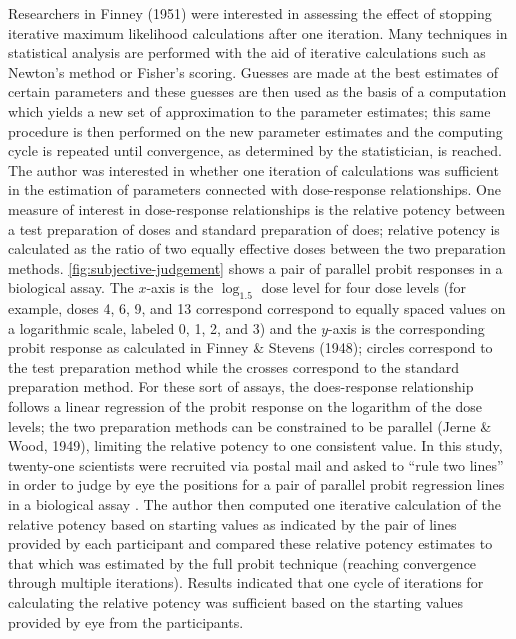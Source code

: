 \documentclass[print]{nuthesis}
\begin{document}
Researchers in Finney (1951) were interested in assessing the effect of stopping iterative maximum likelihood calculations after one iteration.
Many techniques in statistical analysis are performed with the aid of iterative calculations such as Newton's method or Fisher's scoring.
Guesses are made at the best estimates of certain parameters and these guesses are then used as the basis of a computation which yields a new set of approximation to the parameter estimates; this same procedure is then performed on the new parameter estimates and the computing cycle is repeated until convergence, as determined by the statistician, is reached.
The author was interested in whether one iteration of calculations was sufficient in the estimation of parameters connected with dose-response relationships.
One measure of interest in dose-response relationships is the relative potency between a test preparation of doses and standard preparation of does; relative potency is calculated as the ratio of two equally effective doses between the two preparation methods.
\cref{fig:subjective-judgement} shows a pair of parallel probit responses in a biological assay.
The \(x\)-axis is the \(\log_{1.5}\) dose level for four dose levels (for example, doses 4, 6, 9, and 13 correspond correspond to equally spaced values on a logarithmic scale, labeled 0, 1, 2, and 3) and the \(y\)-axis is the corresponding probit response as calculated in Finney \& Stevens (1948); circles correspond to the test preparation method while the crosses correspond to the standard preparation method.
For these sort of assays, the does-response relationship follows a linear regression of the probit response on the logarithm of the dose levels; the two preparation methods can be constrained to be parallel (Jerne \& Wood, 1949), limiting the relative potency to one consistent value.
In this study, twenty-one scientists were recruited via postal mail and asked to ``rule two lines'' in order to judge by eye the positions for a pair of parallel probit regression lines in a biological assay .
The author then computed one iterative calculation of the relative potency based on starting values as indicated by the pair of lines provided by each participant and compared these relative potency estimates to that which was estimated by the full probit technique (reaching convergence through multiple iterations).
Results indicated that one cycle of iterations for calculating the relative potency was sufficient based on the starting values provided by eye from the participants.
\end{document}
